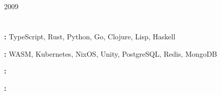 \documentclass[11pt,a4paper]{article}
\newcommand{\header}[2]
{\textbf{#1}\hfill\small{#2}\normalsize\par\vspace{-0.4em}}
\newcommand{\subheader}[2]
{\small\textit{#1}\hfill\textit{#2}\normalsize\vspace{-0.4em}}
\newcommand{\simplelist}[2]
{\small\textbf{#1:} {#2}\normalsize\par\vspace{-0.4em}}
\begin{document}
	\section{\strSectionEducation}

	\header{\strHeaderUniversity}{2009}
	\subheader{\strEducationDegree}{\strLocNovosibirsk}

	\section{\strSectionSkillsInterests}
	\simplelist{\strLabelProgrammingLanguages}{TypeScript, Rust, Python, Go, Clojure, Lisp, Haskell}
	\simplelist{\strLabelTech}{WASM, Kubernetes, NixOS, Unity, PostgreSQL, Redis, MongoDB}
	\simplelist{\strLabelSpokenLanguages}{\strSpokenLanguagesList}
	\simplelist{\strLabelInterests}{\strInterestsList}
\end{document}
